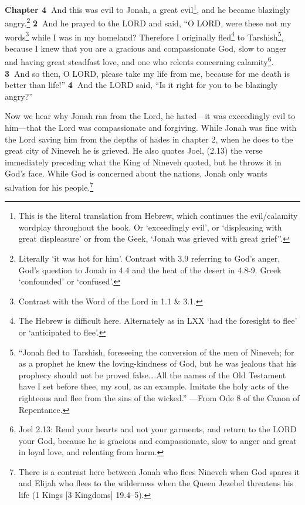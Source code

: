 \documentclass[
]{article}
\newcommand{\RL}[1]{\beginR #1\endR}
\begin{document}
\textbf{Chapter 4~}And this was evil to Jonah, a great evil\footnote{This
  is the literal translation from Hebrew, which continues the
  evil/calamity wordplay throughout the book. Or `exceedingly evil', or
  `displeasing with great displeasure' or from the Geek, `Jonah was
  grieved with great grief''.}, and he became blazingly
angry.\footnote{Literally `it was hot for him'. Contrast with 3.9
  referring to God's anger, God's question to Jonah in 4.4 and the heat
  of the desert in 4.8-9. Greek `confounded' or `confused'.}
\textbf{2~}And he prayed to the LORD and said, \RL{``}O LORD, were these
not my words\footnote{Contrast with the Word of the Lord in 1.1 \& 3.1.}
while I was in my homeland? Therefore I originally fled\footnote{The
  Hebrew is difficult here. Alternately as in LXX `had the foresight to
  flee' or `anticipated to flee'.} to Tarshish\footnote{``Jonah fled to
  Tarshish, foreseeing the conversion of the men of Nineveh; for as a
  prophet he knew the loving-kindness of God, but he was jealous that
  his prophecy should not be proved false\ldots.All the names of the Old
  Testament have I set before thee, my soul, as an example. Imitate the
  holy acts of the righteous and flee from the sins of the wicked.''
  ---From Ode 8 of the Canon of Repentance.}, because I knew that you
are a gracious and compassionate God, slow to anger and having great
steadfast love, and one who relents concerning calamity\footnote{Joel
  2.13: Rend your hearts and not your garments, and return to the LORD
  your God, because he is gracious and compassionate, slow to anger and
  great in loyal love, and relenting from harm.}. \textbf{3~}And so
then, O LORD, please take my life from me, because for me death is
better than life!'' \textbf{4~}And the LORD said, \RL{``}Is it right for
you to be blazingly angry?''

Now we hear why Jonah ran from the Lord, he hated---it was exceedingly
evil to him---that the Lord was compassionate and forgiving. While Jonah
was fine with the Lord saving him from the depths of hades in chapter 2,
when he does to the great city of Nineveh he is grieved. He also quotes
Joel, (2.13) the verse immediately preceding what the King of Nineveh
quoted, but he throws it in God's face. While God is concerned about the
nations, Jonah only wants salvation for his people.\footnote{There is a
  contrast here between Jonah who flees Nineveh when God spares it and
  Elijah who flees to the wilderness when the Queen Jezebel threatens
  his life (1 Kings {[}3 Kingdoms{]} 19.4--5).}
\end{document}
